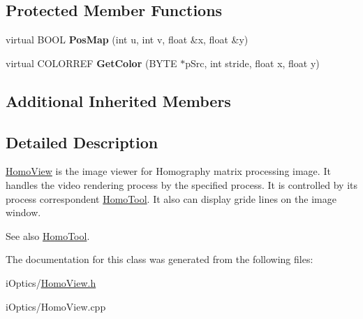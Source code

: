 \subsection*{Protected Member Functions}
\begin{DoxyCompactItemize}
\item 
\mbox{\label{class_homo_view_aaaa286aa764b94ccae653b34369a8036}} 
virtual B\+O\+OL {\bfseries Pos\+Map} (int u, int v, float \&x, float \&y)
\item 
\mbox{\label{class_homo_view_af79fa4c9d889d996557d6f9ee4979e6c}} 
virtual C\+O\+L\+O\+R\+R\+EF {\bfseries Get\+Color} (B\+Y\+TE $\ast$p\+Src, int stride, float x, float y)
\end{DoxyCompactItemize}
\subsection*{Additional Inherited Members}


\subsection{Detailed Description}
\mbox{\hyperlink{class_homo_view}{Homo\+View}} is the image viewer for Homography matrix processing image. It handles the video rendering process by the specified process. It is controlled by its process correspondent \mbox{\hyperlink{class_homo_tool}{Homo\+Tool}}. It also can display gride lines on the image window. 

\begin{DoxySeeAlso}{See also}
\mbox{\hyperlink{class_homo_tool}{Homo\+Tool}}. 
\end{DoxySeeAlso}


The documentation for this class was generated from the following files\+:\begin{DoxyCompactItemize}
\item 
i\+Optics/\mbox{\hyperlink{_homo_view_8h}{Homo\+View.\+h}}\item 
i\+Optics/Homo\+View.\+cpp\end{DoxyCompactItemize}
